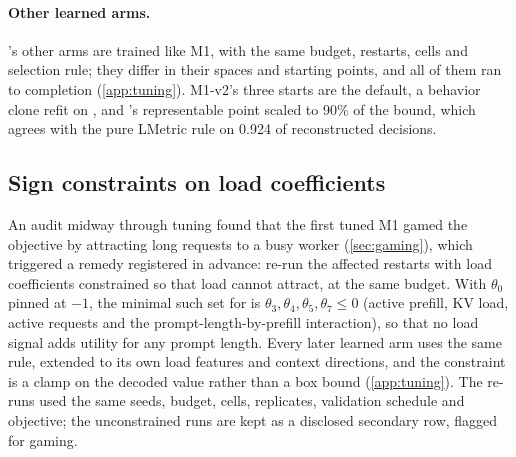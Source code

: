 \paragraph{Other learned arms.}
's other arms are trained like M1, with the same budget, restarts, cells and
selection rule; they differ in their spaces and starting points, and all of them ran to completion
(\cref{app:tuning}). M1-v2's three starts are the default, a behavior clone refit on , and
's representable point scaled to 90\% of the bound, which agrees with the pure
LMetric rule on 0.924 of reconstructed decisions.

\subsection{Sign constraints on load coefficients}
\label{sec:sign-constraint}

An audit midway through tuning found that the first tuned M1 gamed the objective by attracting long
requests to a busy worker (\cref{sec:gaming}), which triggered a remedy registered in advance:
re-run the affected restarts with load coefficients constrained so that load cannot attract, at
the same budget. With $\theta_0$ pinned at $-1$, the minimal such set for  is
$\theta_3, \theta_4, \theta_5, \theta_7 \le 0$ (active prefill, KV load, active requests and the
prompt-length-by-prefill interaction), so that no load signal adds utility for any prompt length.
Every later learned arm uses the same rule, extended to its own load features and context
directions, and the constraint is a clamp on the decoded value rather than a box bound
(\cref{app:tuning}). The re-runs used the same seeds, budget, cells, replicates, validation
schedule and objective; the unconstrained runs are kept as a disclosed secondary row, flagged for
gaming.

